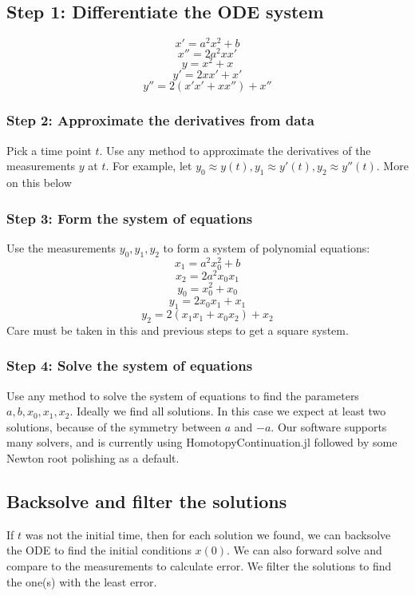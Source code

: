 \documentclass{ifacconf}
\begin{document}
	\subsection{Step 1: Differentiate  the ODE system}
	\[ x' = a^2x^2 + b\]
	\[ x'' = 2a^2x x' \]
	\[ y = x^2 + x \]
	\[ y' = 2x x' + x' \]
	\[ y'' = 2(x'x' + x x'') + x'' \]
	\subsubsection{Step 2: Approximate the derivatives from data}
	Pick a time point $t$.  Use any method to approximate the derivatives of the measurements $y$ at $t$.  For example, let $y_0 \approx y(t), y_1 \approx y'(t), y_2 \approx y''(t).$  More on this below
	
	\subsubsection{Step 3: Form the system of equations}
	Use the measurements $y_0, y_1, y_2$ to form a system of polynomial equations:
	\[x_1 = a^2x_0^2 + b\]
	\[x_2 = 2a^2x_0 x_1\]
	\[ y_0 = x_0^2 + x_0 \]
	\[ y_1 = 2x_0 x_1 + x_1 \]
	\[ y_2 = 2(x_1x_1 + x_0 x_2) + x_2 \]
	Care must be taken in this and previous steps to get a square system.
	
	\subsubsection{Step 4: Solve the system of equations}
	Use any method to solve the system of equations to find the parameters $a, b, x_0, x_1, x_2$. Ideally we find all solutions.  In this case we expect at least two solutions, because of the symmetry between $a$ and $-a$.  Our software supports many solvers, and is currently using HomotopyContinuation.jl followed by some Newton root polishing as a default.
	
	\subsection{Backsolve and filter the solutions}  %
	If $t$ was not the initial time, then for each solution we found, we can backsolve the ODE to find the initial conditions $x(0)$.  We can also forward solve and compare to the measurements to calculate error.  We filter the solutions to find the one(s) with the least error.  
	
\end{document}
